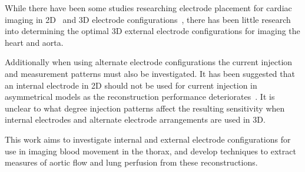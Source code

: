 While there have been some studies researching electrode placement for cardiac
imaging in 2D~\parencite{Noordegraaf1996} and 
3D electrode configurations~\parencite{Graham2007}, there has 
been little research into determining the optimal 3D external electrode configurations
for imaging the heart and aorta. 

Additionally when using alternate electrode configurations the current injection and 
measurement patterns must also be investigated. It has been suggested that  an internal electrode
in 2D
should not be used for current injection in asymmetrical models
as the reconstruction performance deteriorates~\parencite{NasehiTehrani2012}. 
It is unclear 
to what degree injection patterns affect the resulting sensitivity when
internal electrodes and alternate electrode arrangements are used in 3D.

This work aims to investigate internal and 
external electrode configurations for use in imaging blood movement 
in the thorax, and develop techniques to extract measures of 
aortic flow and lung perfusion from these reconstructions.

%

